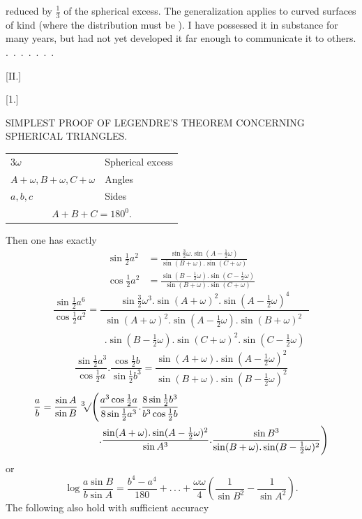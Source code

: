 %
reduced by $\frac13$ of the spherical excess. The generalization applies to curved surfaces of  kind (where the distribution must be ). I have possessed it in substance for many years, but had not yet developed it far enough to communicate it to others. \mbox{. . . . . . .}
\par{}
\begin{center}[II.]\end{center}
\begin{center}[1.]\end{center}
\begin{center}SIMPLEST PROOF OF LEGENDRE'S THEOREM CONCERNING SPHERICAL TRIANGLES.\end{center}
\begin{center}\begin{tabular}{ll}
$3\omega$ & Spherical excess\\
$A+\omega,B+\omega,C+\omega$ & Angles\\
$a,b,c$ & Sides\\
\multicolumn{2}{c}{$A+B+C=180^0.$}
\end{tabular}\end{center}
\noindent\hspace*{1.2em}Then one has exactly
\[
\begin{aligned}
\sin\tfrac12 a^2&=\frac{\sin\tfrac32\omega.\sin(A-\tfrac12\omega)}{\sin(B+\omega).\sin(C+\omega)}\\
\cos\tfrac12 a^2&=\frac{\sin(B-\tfrac12\omega).\sin(C-\tfrac12\omega)}{\sin(B+\omega).\sin(C+\omega)}
\end{aligned}
\]
\[
\frac{\sin\frac12 a^6}{\cos\frac12 a^2}=\frac{\sin\frac32\omega^3.\sin(A+\omega)^2.\sin(A-\frac12\omega)^4}{\begin{gathered}\sin(A+\omega)^2.\sin(A-\frac12\omega).\sin(B+\omega)^2\\.\sin(B-\frac12\omega).\sin(C+\omega)^2.\sin(C-\frac12\omega)\end{gathered}}
\]
\[
\frac{\sin\frac12 a^3}{\cos\frac12 a}.\frac{\cos\frac12 b}{\sin\frac12 b^3}=\frac{\sin(A+\omega).\sin(A-\frac12\omega)^2}{\sin(B+\omega).\sin(B-\frac12\omega)^2}
\]
\[
\begin{aligned}
\frac ab=\frac{\sin A}{\sin B}\mkern6mu{}^3\mkern-4mu\mathord{\surd}\Biggl(&\frac{a^3\cos\frac12 a}{8\sin\frac12 a^3}.\frac{8\sin\frac12 b^3}{b^3\cos\frac12 b}\\
&.\frac{\sin(A+\omega).\sin(A-\frac12\omega)^2}{\sin A^3}.\frac{\sin B^3}{\sin(B+\omega).\sin(B-\frac12\omega)^2}\Biggr)
\end{aligned}
\]
\noindent or
\[
\log\frac{a\sin B}{b\sin A}=\frac{b^4-a^4}{180}+.\, .\, .+\frac{\omega\omega}{4}\left(\frac{1}{\sin B^2}-\frac{1}{\sin A^2}\right).
\]
\noindent The following also hold with sufficient accuracy
